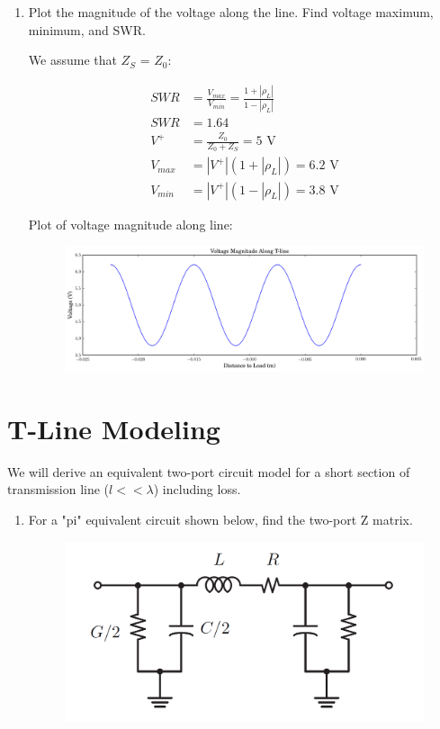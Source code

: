 \documentclass[11pt]{article}
\begin{document}
\begin{enumerate}
	\item Plot the magnitude of the voltage along the line. Find voltage maximum, minimum, and SWR.
	
	We assume that $Z_S$ = $Z_0$:
	
	\begin{align*}
		SWR &= \frac{V_{max}}{V_{min}} = \frac{1 + |\rho_L|}{1 - |\rho_L|} \\
		SWR &= 1.64 \\
		V^+ &= \frac{Z_0}{Z_0 + Z_S} = 5 \text{ V} \\
		V_{max} &= |V^+| (1 + |\rho_L|) = 6.2 \text{ V} \\
		V_{min} &= |V^+| (1 - |\rho_L|) = 3.8 \text{ V} 
	\end{align*}
	
	Plot of voltage magnitude along line:
	\begin{figure}[H]
		\centering \includegraphics[width=\textwidth]{images/problem1.png}
	\end{figure}
\end{enumerate}

\section{T-Line Modeling}
We will derive an equivalent two-port circuit model for a short section of transmission line ($l << \lambda$) including loss.

\begin{enumerate}
	\item For a "pi" equivalent circuit shown below, find the two-port Z matrix.
		\begin{figure}[H]
		\centering \includegraphics[width=\textwidth-6cm]{images/problem2_pi_network.png}
	\end{figure}
	
\end{enumerate}
\end{document}
